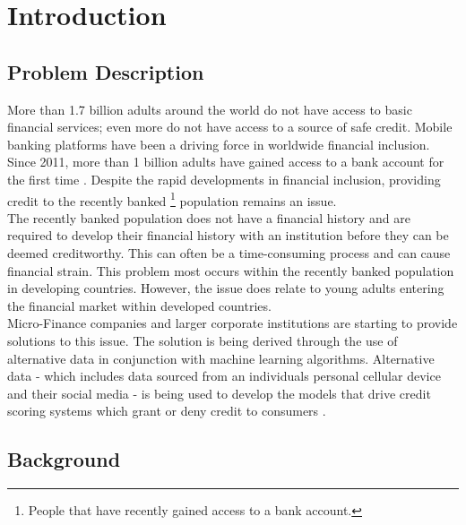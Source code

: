 \chapter{Introduction} 
\label{Chapter1}

\section{Problem Description}

More than 1.7 billion adults around the world do not have access to basic financial services; even more do not have access to a source of safe credit. Mobile banking platforms have been a driving force in worldwide financial inclusion. Since 2011, more than 1 billion adults have gained access to a bank account for the first time \parencite{WorldBank}. Despite the rapid developments in financial inclusion, providing credit to the recently banked \footnote{People that have recently gained access to a bank account.} population remains an issue. \\

The recently banked population does not have a financial history and are required to develop their financial history with an institution before they can be deemed creditworthy. This can often be a time-consuming process and can cause financial strain. This problem most occurs within the recently banked population in developing countries. However, the issue does relate to young adults entering the financial market within developed countries. \\

Micro-Finance companies and larger corporate institutions are starting to provide solutions to this issue. The solution is being derived through the use of alternative data in conjunction with machine learning algorithms. Alternative data - which includes data sourced from an individuals personal cellular device and their social media - is being used to develop the models that drive credit scoring systems which grant or deny credit to consumers \parencite{BigDataMicroFiance}. 


\section{Background}

